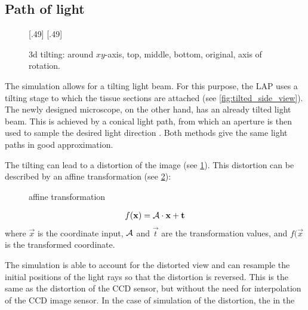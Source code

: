 \subsection{Path of light}
\label{sec:pathOfLight}
%
\begin{figure}[!t]
\setlength{\tikzheight}{0.42\textwidth}
[.49\textwidth]{
}\hfill
{}[.49\textwidth]{
}
\tikzset{external/export=false}
\caption[3d tilting]{3d tilting: around $xy$-axis, \raisebox{.25em}{\tikz \draw[red,thick](0,0)--(0.25,0);} top, \raisebox{.25em}{\tikz \draw[green,thick](0,0)--(0.25,0);} middle, \raisebox{.25em}{\tikz \draw[blue,thick](0,0)--(0.25,0);} bottom, \raisebox{.25em}{\tikz \draw[dash pattern=on 1.25pt off 1.25pt,thick](0,0)--(0.25,0);} original, \raisebox{.25em}{\tikz \draw[gray](0,0)--(0.25,0);} axis of rotation.}
\label{fig:tilting_camera_view}
\end{figure}
%
The simulation allows for a tilting light beam.
For this purpose, the \ac{LAP} uses a tilting stage to which the tissue sections are attached (see \cref{fig:tilted_side_view}).
The newly designed microscope, on the other hand, has an already tilted light beam.
This is achieved by a conical light path, from which an aperture is then used to sample the desired light direction \cite{Wiese:887678}.
Both methods give the same light paths in good approximation.
\par
%
The tilting can lead to a distortion of the image (see \cref{fig:tilting_camera_view}).
This distortion can be described by an affine transformation (see \cref{fig::affine_transformation}):
%
\begin{figure}[!t]
\centering

\caption{affine transformation}
\label{fig::affine_transformation}
\end{figure}
%
\begin{align}
f(\mathbf{x}) = \mathcal{A} \cdot \mathbf{x} + \mathbf{t}
\end{align}
where $\vec{x}$ is the coordinate input, $\mathcal{A}$ and $\vec{t}$ are the transformation values, and $f(\vec{x}$ is the transformed coordinate.
\par
%
The simulation is able to account for the distorted view and can resample the initial positions of the light rays so that the distortion is reversed.
This is the same as the distortion of the \ac{CCD} sensor, but without the need for interpolation of the \ac{CCD} image sensor.
In the case of simulation of the distortion, the in the 
